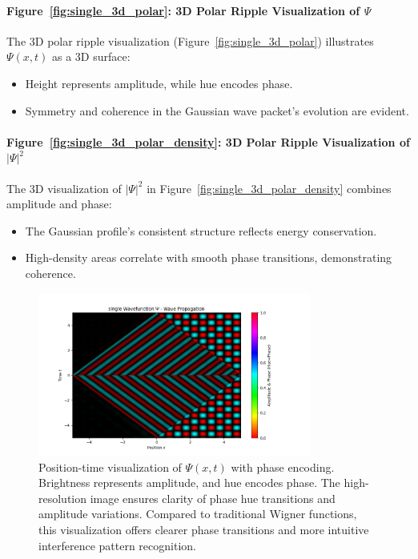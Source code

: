 \documentclass[12pt]{article}
\begin{document}
\paragraph{Figure~\ref{fig:single_3d_polar}: 3D Polar Ripple Visualization of \(\Psi\)}
The 3D polar ripple visualization (Figure~\ref{fig:single_3d_polar}) illustrates \(\Psi(x,t)\) as a 3D surface:
\begin{itemize}
    \item Height represents amplitude, while hue encodes phase.
    \item Symmetry and coherence in the Gaussian wave packet's evolution are evident.
\end{itemize}

\paragraph{Figure~\ref{fig:single_3d_polar_density}: 3D Polar Ripple Visualization of \(|\Psi|^2\)}
The 3D visualization of \(|\Psi|^2\) in Figure~\ref{fig:single_3d_polar_density} combines amplitude and phase:
\begin{itemize}
    \item The Gaussian profile's consistent structure reflects energy conservation.
    \item High-density areas correlate with smooth phase transitions, demonstrating coherence.
\end{itemize}

\begin{figure}[H]
    \centering
    \includegraphics[width=0.8\textwidth]{images/single_wavefunction_with_phase.png}
    \caption{Position-time visualization of \(\Psi(x,t)\) with phase encoding. Brightness represents amplitude, and hue encodes phase. The high-resolution image ensures clarity of phase hue transitions and amplitude variations. Compared to traditional Wigner functions, this visualization offers clearer phase transitions and more intuitive interference pattern recognition.}
    \label{fig:single_xt}
\end{figure}
\end{document}
